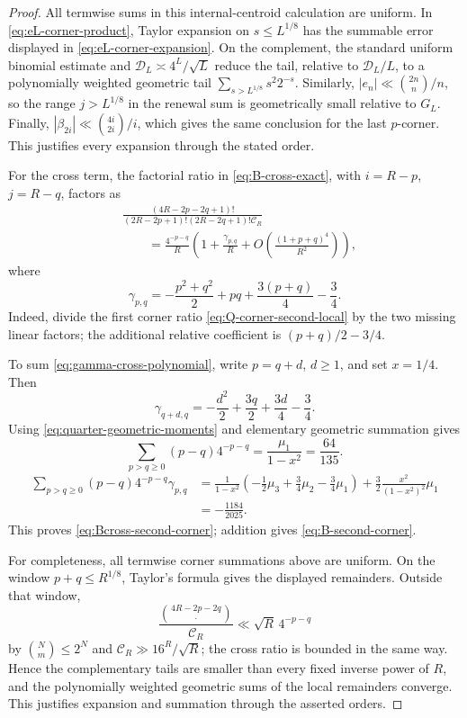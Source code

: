 \documentclass[10pt,a4paper]{amsart}
\begin{document}
\begin{proof}
All termwise sums in this internal-centroid calculation are uniform.  In
\eqref{eq:eL-corner-product}, Taylor expansion on
\(s\le L^{1/8}\) has the summable error displayed in
\eqref{eq:eL-corner-expansion}.  On the complement, the standard uniform
binomial estimate and \(\mathscr D_L\asymp4^L/\sqrt L\) reduce the tail,
relative to \(\mathscr D_L/L\), to a polynomially weighted geometric
tail \(\sum_{s>L^{1/8}}s^2 2^{-s}\).  Similarly,
\(|e_n|\ll\binom{2n}{n}/n\), so the range \(j>L^{1/8}\) in the renewal
sum is geometrically small relative to \(G_L\).  Finally,
\(|\beta_{2i}|\ll\binom{4i}{2i}/i\), which gives the same conclusion for
the last \(p\)-corner.  This justifies every expansion through the stated
order.

For the cross term, the factorial ratio in \eqref{eq:B-cross-exact}, with
\(i=R-p\), \(j=R-q\), factors as
\begin{align}
 &\frac{(4R-2p-2q+1)!}
 {(2R-2p+1)!(2R-2q+1)!\mathscr C_R}\nonumber\\
 &\qquad=
 \frac{4^{-p-q}}R\left(
 1+\frac{\gamma_{p,q}}R
 +O\!\left(\frac{(1+p+q)^4}{R^2}\right)\right),
 \label{eq:cross-corner-local-second}
\end{align}
where
\begin{equation}
 {
 \gamma_{p,q}
 =-\frac{p^2+q^2}{2}+pq+\frac{3(p+q)}4-\frac34.}
 \label{eq:gamma-cross-polynomial}
\end{equation}
Indeed, divide the first corner ratio
\eqref{eq:Q-corner-second-local} by the two missing linear factors; the
additional relative coefficient is \((p+q)/2-3/4\).

To sum \eqref{eq:gamma-cross-polynomial}, write \(p=q+d\), \(d\ge1\),
and set \(x=1/4\).  Then
\[
 \gamma_{q+d,q}
 =-\frac{d^2}{2}+\frac{3q}{2}+\frac{3d}{4}-\frac34.
\]
Using \eqref{eq:quarter-geometric-moments} and elementary geometric
summation gives
\begin{equation}
 \sum_{p>q\ge0}(p-q)4^{-p-q}
 =\frac{\mu_1}{1-x^2}=\frac{64}{135}.
 \label{eq:cross-leading-geometric-sum}
\end{equation}
\begin{align}
 \sum_{p>q\ge0}(p-q)4^{-p-q}\gamma_{p,q}
 &=\frac1{1-x^2}
 \left(-\frac12\mu_3+\frac34\mu_2-\frac34\mu_1\right)
 +\frac32\frac{x^2}{(1-x^2)^2}\mu_1\nonumber\\
 &=-\frac{1184}{2025}.
 \label{eq:cross-second-geometric-sum}
\end{align}
This proves \eqref{eq:Bcross-second-corner}; addition gives
\eqref{eq:B-second-corner}.

For completeness, all termwise corner summations above are uniform.  On
the window \(p+q\le R^{1/8}\), Taylor's formula gives the displayed
remainders.  Outside that window,
\[
 \frac{\binom{4R-2p-2q}{\,\cdot\,}}{\mathscr C_R}
 \ll \sqrt R\,4^{-p-q}
\]
by \(\binom Nm\le2^N\) and
\(\mathscr C_R\gg16^R/\sqrt R\); the cross ratio is bounded in the same
way.  Hence the complementary tails are smaller than every fixed inverse
power of \(R\), and the polynomially weighted geometric sums of the local
remainders converge.  This justifies expansion and summation through the
asserted orders.
\end{proof}
\end{document}
